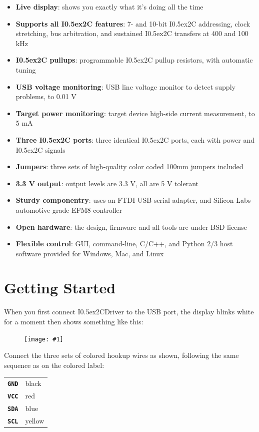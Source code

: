 \documentclass{article}
\newcommand{\two}{\raise0.5ex\hbox{\footnotesize{2}}}
\newcommand{\iic}{I\two{}C}
\newcommand{\iicdriver}{I\two{}CDriver}
\newcommand{\png}[1]{
\begin{figure}[H]
\begin{center}
\texttt{[image: \#1]}
\end{center}
\end{figure}
}
\newcommand{\mach}[1]{\texttt{\textbf{#1}}}
\newcommand{\gap}{\vspace{10pt}}
\begin{document}
\begin{itemize}
\item \textbf{Live display}: shows you exactly what it's doing all the time  
\item \textbf{Supports all \iic{} features}: 7- and 10-bit \iic{} addressing, clock stretching, bus arbitration,
and sustained \iic{} transfers at 400 and 100 kHz  
\item \textbf{\iic{} pullups}: programmable \iic{} pullup resistors, with automatic tuning  
\item \textbf{USB voltage monitoring}: USB line voltage monitor to detect supply problems, to 0.01 V  
\item \textbf{Target power monitoring}: target device high-side current measurement, to 5 mA  
\item \textbf{Three \iic{} ports}: three identical \iic{} ports, each with power and \iic{} signals  
\item \textbf{Jumpers}: three sets of high-quality color coded 100mm jumpers included
\item \textbf{3.3 V output}: output levels are 3.3 V, all are 5 V tolerant  
\item \textbf{Sturdy componentry}: uses an FTDI USB serial adapter, and Silicon Labs automotive-grade EFM8 controller  
\item \textbf{Open hardware}: the design, firmware and all tools are under BSD license
\item \textbf{Flexible control}: GUI, command-line, C/C++, and Python 2/3 host software provided for Windows, Mac, and Linux  
\end{itemize}

\newpage
\section{Getting Started}

When you first connect \iicdriver{} to the USB port, the display blinks white for a moment then shows something like this:

\png{img/i2cdriver/DSC_9039}

Connect the three sets of colored hookup wires as shown,
following the same sequence as on the colored label:

\gap
\begin{center}
\begin{tabular}{ll}
\hline
\mach{GND}  & black \\
\mach{VCC}  & red \\
\mach{SDA}  & blue \\
\mach{SCL}  & yellow \\
\hline
\end{tabular}
\end{center}
\gap
\end{document}
